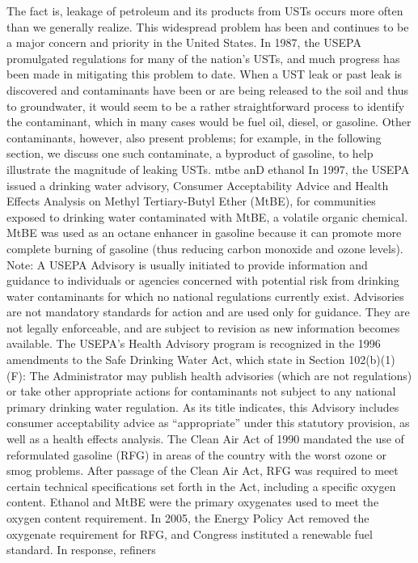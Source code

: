 \documentclass{article}
\begin{document}
The fact is, leakage of petroleum and its products from USTs occurs more
often than we generally realize. This widespread problem has been and
continues to be a major concern and priority in the United States. In
1987, the USEPA promulgated regulations for many of the nation's USTs,
and much progress has been made in mitigating this problem to date. When
a UST leak or past leak is discovered and contaminants have been or are
being released to the soil and thus to groundwater, it would seem to be
a rather straightforward process to identify the contaminant, which in
many cases would be fuel oil, diesel, or gasoline. Other contaminants,
however, also present problems; for example, in the following section,
we discuss one such contaminate, a byproduct of gasoline, to help
illustrate the magnitude of leaking USTs. mtbe anD ethanol In 1997, the
USEPA issued a drinking water advisory, Consumer Acceptability Advice
and Health Effects Analysis on Methyl Tertiary-Butyl Ether (MtBE), for
communities exposed to drinking water contaminated with MtBE, a volatile
organic chemical. MtBE was used as an octane enhancer in gasoline
because it can promote more complete burning of gasoline (thus reducing
carbon monoxide and ozone levels). Note: A USEPA Advisory is usually
initiated to provide information and guidance to individuals or agencies
concerned with potential risk from drinking water contaminants for which
no national regulations currently exist. Advisories are not mandatory
standards for action and are used only for guidance. They are not
legally enforceable, and are subject to revision as new information
becomes available. The USEPA's Health Advisory program is recognized in
the 1996 amendments to the Safe Drinking Water Act, which state in
Section 102(b)(1)(F): The Administrator may publish health advisories
(which are not regulations) or take other appropriate actions for
contaminants not subject to any national primary drinking water
regulation. As its title indicates, this Advisory includes consumer
acceptability advice as ``appropriate'' under this statutory provision,
as well as a health effects analysis. The Clean Air Act of 1990 mandated
the use of reformulated gasoline (RFG) in areas of the country with the
worst ozone or smog problems. After passage of the Clean Air Act, RFG
was required to meet certain technical specifications set forth in the
Act, including a specific oxygen content. Ethanol and MtBE were the
primary oxygenates used to meet the oxygen content requirement. In 2005,
the Energy Policy Act removed the oxygenate requirement for RFG, and
Congress instituted a renewable fuel standard. In response, refiners
\end{document}

